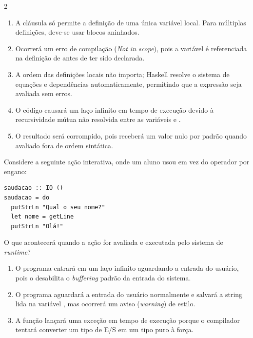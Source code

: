 \documentclass[a4paper,10pt,brazil]{article}
\begin{document}
\begin{multicols}{2}
\begin{enumerate}
  \item A cláusula  só permite a definição de uma única variável local. Para múltiplas definições, deve-se usar blocos  aninhados.

  \item Ocorrerá um erro de compilação (\emph{Not in scope}), pois a variável  é referenciada na definição de  antes de ter sido declarada.

  \item A ordem das definições locais não importa; Haskell resolve o sistema de equações e dependências automaticamente, permitindo que a expressão seja avaliada sem erros.

  \item O código causará um laço infinito em tempo de execução devido à recursividade mútua não resolvida entre as variáveis  e .

  \item O resultado será corrompido, pois  receberá um valor nulo por padrão quando avaliado fora de ordem sintática.


\end{enumerate}

Considere a seguinte ação interativa, onde um aluno usou  em vez do operador \haskellinline{<-} por engano:

\begin{verbatim}
saudacao :: IO ()
saudacao = do
  putStrLn "Qual o seu nome?"
  let nome = getLine
  putStrLn "Olá!"
\end{verbatim}

O que acontecerá quando a ação  for avaliada e executada pelo sistema de \emph{runtime}?

\begin{enumerate}
  \item O programa entrará em um laço infinito aguardando a entrada do usuário, pois o  desabilita o \emph{buffering} padrão da entrada do sistema.

  \item O programa aguardará a entrada do usuário normalmente e salvará a string lida na variável , mas ocorrerá um aviso (\emph{warning}) de estilo.

  \item A função  lançará uma exceção em tempo de execução porque o compilador tentará converter um tipo de E/S em um tipo puro à força.


\end{enumerate}
\end{multicols}
\end{document}
